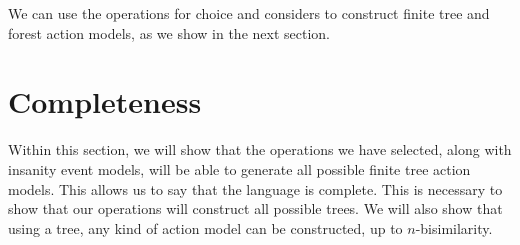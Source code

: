 We can use the operations for choice and considers to construct finite tree and
forest action models, as we show in the next section.

\section{Completeness} \label{subsec:multi:completeness}

Within this section, we will show that the operations we have selected, along with insanity event
models, will be able to generate all possible finite tree action models.
This allows us to say that the language is complete.
This is necessary to show that our operations will construct all possible trees.
We will also show that using a tree, any kind of action model can be constructed, up to $n$-bisimilarity.

